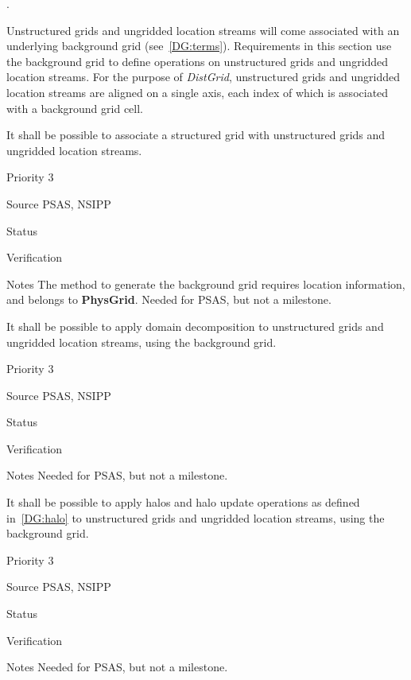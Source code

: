  \label{DG:Unstructured}.

Unstructured grids and ungridded location streams will come associated
with an underlying background grid (see~\ref{DG:terms}). Requirements
in this section use the background grid to define operations on
unstructured grids and ungridded location streams. For the purpose of
\emph{DistGrid}, unstructured grids and ungridded location streams are
aligned on a single axis, each index of which is associated with a
background grid cell.


It shall be possible to associate a structured grid with unstructured
grids and ungridded location streams.

\begin{reqlist}
\item[Priority] 3
\item[Source] PSAS, NSIPP
\item[Status]
\item[Verification]
\item[Notes] The method to generate the background grid requires
  location information, and belongs to \textbf{PhysGrid}.  Needed
  for PSAS, but not a milestone.
\end{reqlist}


It shall be possible to apply domain decomposition to unstructured
grids and ungridded location streams, using the background grid.

\begin{reqlist}
\item[Priority] 3
\item[Source] PSAS, NSIPP
\item[Status] 
\item[Verification]
\item[Notes]  Needed for PSAS, but not a milestone.
\end{reqlist}


It shall be possible to apply halos and halo update operations as
defined in~\ref{DG:halo} to unstructured grids and ungridded location
streams, using the background grid.

\begin{reqlist}
\item[Priority] 3
\item[Source] PSAS, NSIPP
\item[Status]
\item[Verification]
\item[Notes] Needed for PSAS, but not a milestone.
\end{reqlist}

